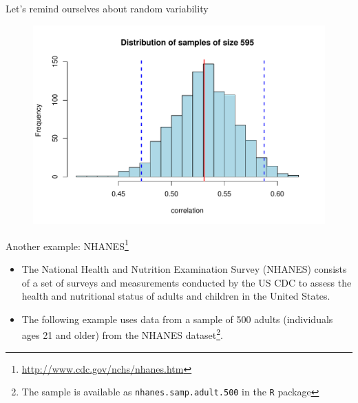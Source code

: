 \documentclass[10pt]{beamer}\usepackage[]{graphicx}\usepackage[]{color}
\makeatletter
\def\maxwidth{ %
  \ifdim\Gin@nat@width>\linewidth
    \linewidth
  \else
    \Gin@nat@width
  \fi
}
\newenvironment{knitrout}{}{} %
\makeatother
\begin{document}
\begin{frame}[fragile]{Let's remind ourselves about random variability}
\begin{figure}
\begin{minipage}[h]{0.59\linewidth}
\begin{knitrout}
{\centering \includegraphics[width=\maxwidth]{figure/histboot-1} 

}



\end{knitrout}
	\end{minipage}
\end{figure}



\end{frame}



\begin{frame}{Another example: NHANES\footnote{\tiny{\url{http://www.cdc.gov/nchs/nhanes.htm}}}}
	\begin{itemize}
		\item The National Health and Nutrition Examination Survey (NHANES) consists of a set of surveys and measurements conducted by the US CDC to assess the health and nutritional status of adults	and children in the United States. 
		\item The following example uses data from a sample of 500 adults (individuals ages 21 and older) from the NHANES dataset\footnote{\tiny{The sample is available as \texttt{nhanes.samp.adult.500} in the \texttt{R}  package}}.
	\end{itemize}
\end{frame}
\end{document}
